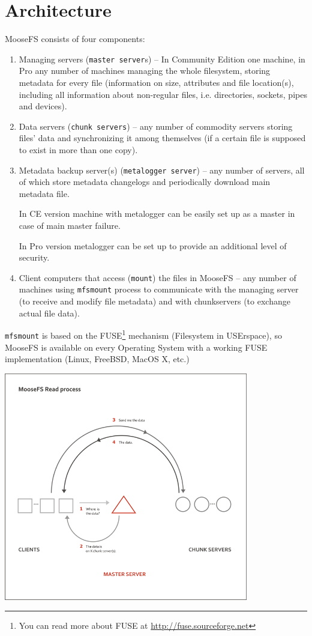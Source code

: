 \documentclass[a4paper,11pt,english]{report}
\def\code#1{\texttt{#1}}
\begin{document}
		\section{Architecture}
		MooseFS consists of four components:
		\begin{enumerate}
			\item Managing servers (\code{master server}s) -- In Community Edition one machine, in Pro any number of machines managing the whole filesystem, storing metadata for every file (information on size, attributes and file location(s), including all information about non-regular files, i.e. directories, sockets, pipes and devices).
			\item Data servers (\code{chunk servers}) -- any number of commodity servers storing files' data and synchronizing it among themselves (if a certain file is supposed to exist in more than one copy).
			\item Metadata backup server(s) (\code{metalogger server}) -- any number of servers, all of which store metadata changelogs and periodically download main metadata file.
			
			In CE version machine with metalogger can be easily set up as a master in case of main master failure.
			
			In Pro version metalogger can be set up to provide an additional level of security.
			\item Client computers that access (\code{mount}) the files in MooseFS -- any number of machines using \code{mfsmount} process to communicate with the managing server (to receive and modify file metadata) and with chunkservers (to exchange actual file data).
		\end{enumerate}

		\bigskip

		\code{mfsmount} is based on the FUSE\footnote{You can read more about FUSE at \url{http://fuse.sourceforge.net}} mechanism (Filesystem in USErspace), so MooseFS is available on every Operating System with a working FUSE implementation (Linux, FreeBSD, MacOS X, etc.)  

		\bigskip

		\begin{center}
			\includegraphics[width=0.8\textwidth]{images/read_mfs.png}\\[1cm]
		\end{center}
\end{document}
